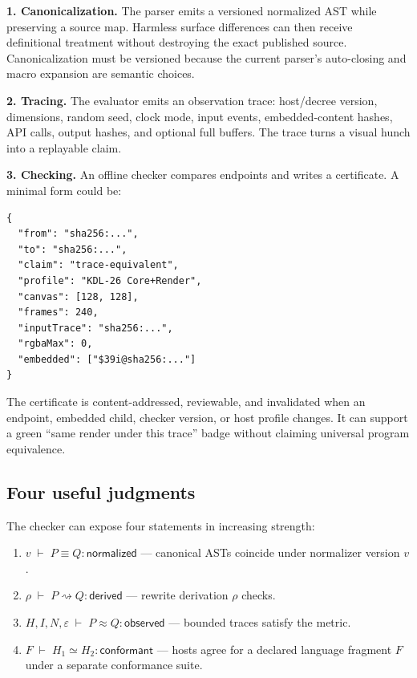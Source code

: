 \documentclass[10pt,letterpaper,twocolumn]{article}
\newcommand{\judges}[3]{#1\;\vdash\;#2:#3}
\newcommand{\claim}[1]{\textsf{#1}}
\begin{document}
\textbf{1. Canonicalization.} The parser emits a versioned normalized AST while preserving a source map. Harmless surface differences can then receive definitional treatment without destroying the exact published source. Canonicalization must be versioned because the current parser's auto-closing and macro expansion are semantic choices.

\textbf{2. Tracing.} The evaluator emits an observation trace: host/decree version, dimensions, random seed, clock mode, input events, embedded-content hashes, API calls, output hashes, and optional full buffers. The trace turns a visual hunch into a replayable claim.

\textbf{3. Checking.} An offline checker compares endpoints and writes a certificate. A minimal form could be:

\begin{lstlisting}[language={},basicstyle=\ttfamily\scriptsize]
{
  "from": "sha256:...",
  "to": "sha256:...",
  "claim": "trace-equivalent",
  "profile": "KDL-26 Core+Render",
  "canvas": [128, 128],
  "frames": 240,
  "inputTrace": "sha256:...",
  "rgbaMax": 0,
  "embedded": ["$39i@sha256:..."]
}
\end{lstlisting}

The certificate is content-addressed, reviewable, and invalidated when an endpoint, embedded child, checker version, or host profile changes. It can support a green ``same render under this trace'' badge without claiming universal program equivalence.

\subsection{Four useful judgments}

The checker can expose four statements in increasing strength:

\begin{enumerate}
\item $\judges{v}{P\equiv Q}{\claim{normalized}}$ --- canonical ASTs coincide under normalizer version $v$.
\item $\judges{\rho}{P\rightsquigarrow Q}{\claim{derived}}$ --- rewrite derivation $\rho$ checks.
\item $\judges{H,I,N,\varepsilon}{P\approx Q}{\claim{observed}}$ --- bounded traces satisfy the metric.
\item $\judges{F}{H_1\simeq H_2}{\claim{conformant}}$ --- hosts agree for a declared language fragment $F$ under a separate conformance suite.
\end{enumerate}
\end{document}
